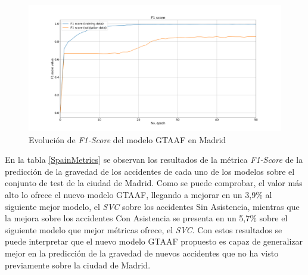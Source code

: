 \begin{figure}[h]
	\centering
	\includegraphics[width=14cm]{Figures/Madrid/madrid_convolution_2d_f1_score_2023-12-03-12 54 29.png}
	\caption{Evolución de \textit{F1-Score} del modelo GTAAF en Madrid}
	\label{MadridLossFunction}
\end{figure}

En la tabla \ref{SpainMetrics} se observan los resultados de la métrica \textit{F1-Score} de la predicción de la gravedad de los accidentes de cada uno de los modelos sobre el conjunto de test de la ciudad de Madrid. Como se puede comprobar, el valor más alto lo ofrece el nuevo modelo GTAAF, llegando a mejorar en un 3,9\% al siguiente mejor modelo, el \textit{SVC} sobre los accidentes Sin Asistencia, mientras que la mejora sobre los accidentes Con Asistencia se presenta en un 5,7\% sobre el siguiente modelo que mejor métricas ofrece, el \textit{SVC}. Con estos resultados se puede interpretar que el nuevo modelo GTAAF propuesto es capaz de generalizar mejor en la predicción de la gravedad de nuevos accidentes que no ha visto previamente sobre la ciudad de Madrid.

